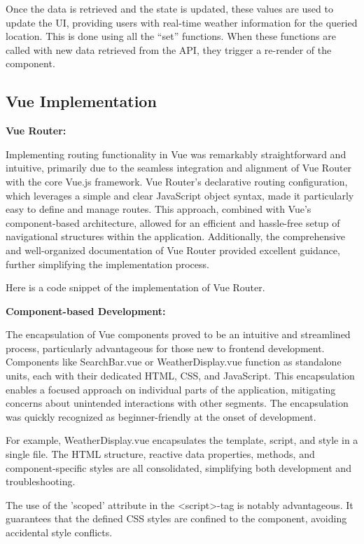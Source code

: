 Once the data is retrieved and the state is updated, these values are used to update the UI, providing users with real-time weather information for the queried location. This is done using all the “set” functions. When these functions are called with new data retrieved from the API, they trigger a re-render of the component. 

\subsection{Vue Implementation}

\textbf{Vue Router:}

Implementing routing functionality in Vue was remarkably straightforward and intuitive, primarily due to the seamless integration and alignment of Vue Router with the core Vue.js framework. Vue Router's declarative routing configuration, which leverages a simple and clear JavaScript object syntax, made it particularly easy to define and manage routes. This approach, combined with Vue's component-based architecture, allowed for an efficient and hassle-free setup of navigational structures within the application. Additionally, the comprehensive and well-organized documentation of Vue Router provided excellent guidance, further simplifying the implementation process.

Here is a code snippet of the implementation of Vue Router.



\textbf{Component-based Development:}

The encapsulation of Vue components proved to be an intuitive and streamlined process, particularly advantageous for those new to frontend development. Components like SearchBar.vue or WeatherDisplay.vue function as standalone units, each with their dedicated HTML, CSS, and JavaScript. This encapsulation enables a focused approach on individual parts of the application, mitigating concerns about unintended interactions with other segments. The encapsulation was quickly recognized as beginner-friendly at the onset of development.

For example, WeatherDisplay.vue encapsulates the template, script, and style in a single file. The HTML structure, reactive data properties, methods, and component-specific styles are all consolidated, simplifying both development and troubleshooting.

The use of the 'scoped' attribute in the  \textless script\textgreater -tag is notably advantageous. It guarantees that the defined CSS styles are confined to the component, avoiding accidental style conflicts.

